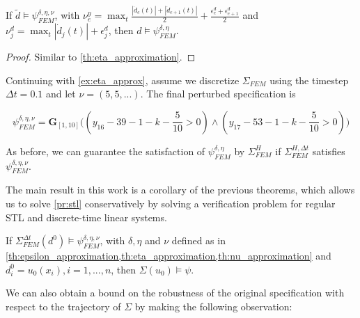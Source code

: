 \documentclass[oribibl]{llncs/llncs}
\newcommand{\Always}{\mathbf{G}}
\begin{document}
\begin{theorem}
    \label{th:nu_approximation}
    If $\tilde d \models \psi^{\delta, \eta, \nu}_{FEM}$, with
    $\nu^y_e = \max_t \frac{|\dot d_e(t)| + |\dot d_{e+1}(t)|}{2} +
    \frac{\epsilon^d_e + \epsilon^d_{e+1}}{2}$ and $\nu^d_j = \max_t
    |\dot d_j(t)| + \epsilon^d_j$, then $d \models \psi^{\delta, \eta}_{FEM}$.
\end{theorem}
\begin{proof}
    Similar to \cref{th:eta_approximation}.
\end{proof}

\begin{example}
    \label{ex:nu_approx}

    Continuing with \cref{ex:eta_approx}, assume we discretize $\Sigma_{FEM}$ using
    the timestep $\Delta t = 0.1$ and let $\nu = (5, 5, ...)$. The final
    perturbed specification is

    \begin{equation}
        \psi^{\delta, \eta, \nu}_{FEM} = \Always_{[1,10]} \bigl(
            (y_{16} - 39 - 1 - k - \frac{5}{10} > 0) \land (y_{17} - 53 - 1 - k
            - \frac{5}{10} > 0)
        \bigr)
    \end{equation}

    As before, we can guarantee the satisfaction of $\psi^{\delta,
    \eta}_{FEM}$ by $\Sigma^H_{FEM}$ if $\Sigma_{FEM}^{H, \Delta t}$ satisfies
    $\psi^{\delta, \eta, \nu}_{FEM}$.
    
\end{example}

The main result in this work is a corollary of the previous theorems, which
allows us to solve \cref{pr:stl}
conservatively by solving a verification problem for regular STL and discrete-time
linear systems. 

\begin{theorem}
    If $\Sigma_{FEM}^{\Delta t}(d^0) \models \psi^{\delta, \eta, \nu}_{FEM}$, with $\delta, \eta$
    and $\nu$ defined as in \cref{th:epsilon_approximation,th:eta_approximation,th:nu_approximation}
    and $d^0_i = u_0(x_i), i = 1,...,n$, then $\Sigma(u_0) \models \psi$.
\end{theorem}

We can also obtain a bound on the robustness of the
original specification with respect to the trajectory of $\Sigma$ by making the
following observation:
\end{document}
